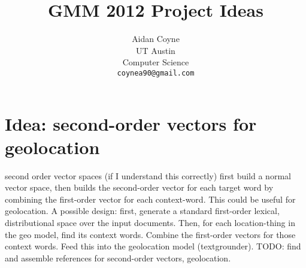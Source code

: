 \documentclass[11pt]{article}
\title{GMM 2012 Project Ideas}
\author{Aidan Coyne \\
    UT Austin\\
    Computer Science\\
  {\tt coynea90@gmail.com} \\}
\date{}
\begin{document}
\maketitle

\section{Idea: second-order vectors for geolocation}
second order vector spaces (if I understand this correctly) first build a normal vector space, then 
builds the second-order vector for each target word by combining the first-order vector for each context-word.
This could be useful for geolocation.
A possible design: first, generate a standard first-order lexical, distributional space over the input documents.
Then, for each location-thing in the geo model, find its context words. Combine
the first-order vectors for those context words.
Feed this into the geolocation model (textgrounder).
TODO: find and assemble references for second-order vectors, geolocation.
\end{document}
